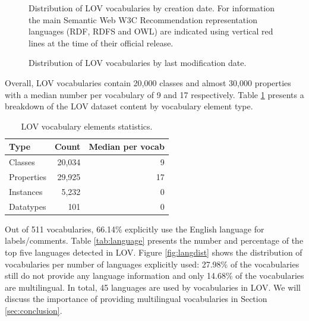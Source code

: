 \documentclass{iosart2c}
\begin{document}
\begin{figure}[htb]
\resizebox{\linewidth}{!}{}
\caption{\label{fig:creaevol} Distribution of LOV vocabularies by creation date. For information the main Semantic Web  W3C Recommendation representation languages (RDF, RDFS and OWL) are indicated using vertical red lines at the time of their official release.}
\end{figure}

\begin{figure}[htb]
\resizebox{\linewidth}{!}{}
\caption{\label{fig:modifevol} Distribution of LOV vocabularies by last modification date.}
\end{figure}


Overall, LOV vocabularies contain 20,000 classes and almost 30,000 properties with a median number per vocabulary of 9 and 17 respectively. Table \ref{tab:elements} presents a breakdown of the LOV dataset content by vocabulary element type. 

\begin{table}[htb]
\caption{LOV vocabulary elements statistics.}
\begin{tabular}{lrr}
\hline
\textbf{Type} & \textbf{Count} &  \textbf{Median per vocab} \\ \hline
Classes & 20,034 & 9 \\
Properties & 29,925 & 17 \\
Instances & 5,232 & 0 \\
Datatypes & 101 & 0 \\
\hline  
\end{tabular}
\label{tab:elements}
\end{table}

Out of 511 vocabularies, 66.14\% explicitly use the English language for labels/comments. Table \ref{tab:language} presents the number and percentage of the top five languages detected in LOV. Figure \ref{fig:langdist} shows the distribution of vocabularies per number of languages explicitly used: 27.98\% of the vocabularies still do not provide any language information and only 14.68\% of the vocabularies are multilingual. In total, 45 languages are used by vocabularies in LOV. We will discuss the importance of providing multilingual vocabularies in Section \ref{sec:conclusion}.
\end{document}
